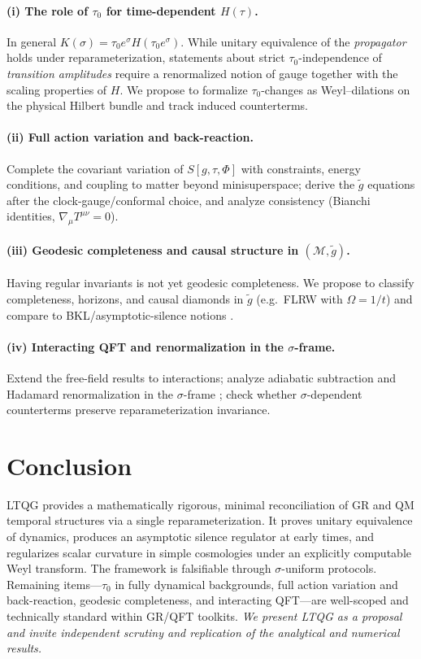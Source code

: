 \documentclass[11pt]{article}
\begin{document}
\paragraph{(i) The role of \(\tau_0\) for time-dependent \(H(\tau)\).}
In general \(K(\sigma)=\tau_0 e^{\sigma}H(\tau_0 e^{\sigma})\).
While unitary equivalence of the \emph{propagator} holds under reparameterization, statements about strict \(\tau_0\)-independence of \emph{transition amplitudes} require a renormalized notion of gauge together with the scaling properties of \(H\). We propose to formalize \(\tau_0\)-changes as Weyl–dilations on the physical Hilbert bundle and track induced counterterms.

\paragraph{(ii) Full action variation and back-reaction.}
Complete the covariant variation of \(S[g,\tau,\Phi]\) with constraints, energy conditions, and coupling to matter beyond minisuperspace; derive the $\tilde g$ equations after the clock-gauge/conformal choice, and analyze consistency (Bianchi identities, $\nabla_\mu T^{\mu\nu}=0$).

\paragraph{(iii) Geodesic completeness and causal structure in $(\mathcal M,\tilde g)$.}
Having regular invariants is not yet geodesic completeness. We propose to classify completeness, horizons, and causal diamonds in $\tilde g$ (e.g.\ FLRW with $\Omega=1/t$) and compare to BKL/asymptotic-silence notions \cite{BKL,AnderssonRendall}.

\paragraph{(iv) Interacting QFT and renormalization in the $\sigma$-frame.}
Extend the free-field results to interactions; analyze adiabatic subtraction and Hadamard renormalization in the $\sigma$-frame \cite{WaldQFTCST,ParkerToms,BirrellDavies}; check whether $\sigma$-dependent counterterms preserve reparameterization invariance.

\section{Conclusion}
LTQG provides a mathematically rigorous, minimal reconciliation of GR and QM temporal structures via a single reparameterization.
It proves unitary equivalence of dynamics, produces an asymptotic silence regulator at early times, and regularizes scalar curvature in simple cosmologies under an explicitly computable Weyl transform. The framework is falsifiable through $\sigma$-uniform protocols.
Remaining items---$\tau_0$ in fully dynamical backgrounds, full action variation and back-reaction, geodesic completeness, and interacting QFT---are well-scoped and technically standard within GR/QFT toolkits.
\emph{We present LTQG as a proposal and invite independent scrutiny and replication of the analytical and numerical results.}
\end{document}
